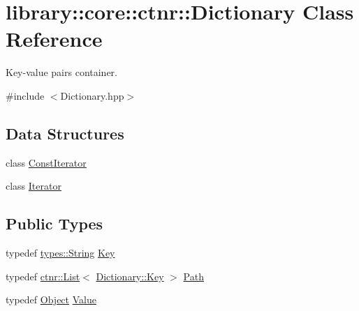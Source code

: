 \hypertarget{classlibrary_1_1core_1_1ctnr_1_1Dictionary}{}\section{library\+:\+:core\+:\+:ctnr\+:\+:Dictionary Class Reference}
\label{classlibrary_1_1core_1_1ctnr_1_1Dictionary}


Key-\/value pairs container.  




{\ttfamily \#include $<$Dictionary.\+hpp$>$}

\subsection*{Data Structures}
\begin{DoxyCompactItemize}
\item 
class \hyperlink{classlibrary_1_1core_1_1ctnr_1_1Dictionary_1_1ConstIterator}{Const\+Iterator}
\item 
class \hyperlink{classlibrary_1_1core_1_1ctnr_1_1Dictionary_1_1Iterator}{Iterator}
\end{DoxyCompactItemize}
\subsection*{Public Types}
\begin{DoxyCompactItemize}
\item 
typedef \hyperlink{classlibrary_1_1core_1_1types_1_1String}{types\+::\+String} \hyperlink{classlibrary_1_1core_1_1ctnr_1_1Dictionary_a987cae687cce70d81a2a483c5e05e842}{Key}
\item 
typedef \hyperlink{namespacelibrary_1_1core_1_1ctnr_a87ccf40619002299b341a5e76e989912}{ctnr\+::\+List}$<$ \hyperlink{classlibrary_1_1core_1_1ctnr_1_1Dictionary_a987cae687cce70d81a2a483c5e05e842}{Dictionary\+::\+Key} $>$ \hyperlink{classlibrary_1_1core_1_1ctnr_1_1Dictionary_a5240b2a04a39b841ed81e52e962f0cbf}{Path}
\item 
typedef \hyperlink{classlibrary_1_1core_1_1ctnr_1_1Object}{Object} \hyperlink{classlibrary_1_1core_1_1ctnr_1_1Dictionary_a3baf6692694e4fc27cb399ac083c88ea}{Value}
\end{DoxyCompactItemize}
